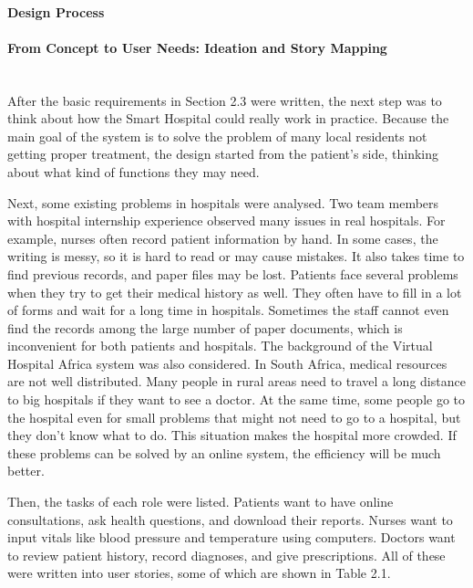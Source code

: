%
%

\paragraph{Design Process}\mbox{}
\paragraph{From Concept to User Needs: Ideation and Story Mapping}\mbox{}\\
After the basic requirements in Section 2.3 were written, the next step was to think about how the Smart Hospital could really work in practice. Because the main goal of the system is to solve the problem of many local residents not getting proper treatment, the design started from the patient’s side, thinking about what kind of functions they may need.

Next, some existing problems in hospitals were analysed. Two team members with hospital internship experience observed many issues in real hospitals. For example, nurses often record patient information by hand. In some cases, the writing is messy, so it is hard to read or may cause mistakes. It also takes time to find previous records, and paper files may be lost. Patients face several problems when they try to get their medical history as well. They often have to fill in a lot of forms and wait for a long time in hospitals. Sometimes the staff cannot even find the records among the large number of paper documents, which is inconvenient for both patients and hospitals.
The background of the Virtual Hospital Africa system was also considered. In South Africa, medical resources are not well distributed. Many people in rural areas need to travel a long distance to big hospitals if they want to see a doctor. At the same time, some people go to the hospital even for small problems that might not need to go to a hospital, but they don’t know what to do. This situation makes the hospital more crowded. If these problems can be solved by an online system, the efficiency will be much better.

Then, the tasks of each role were listed. Patients want to have online consultations, ask health questions, and download their reports. Nurses want to input vitals like blood pressure and temperature using computers. Doctors want to review patient history, record diagnoses, and give prescriptions. All of these were written into user stories, some of which are shown in Table 2.1.

